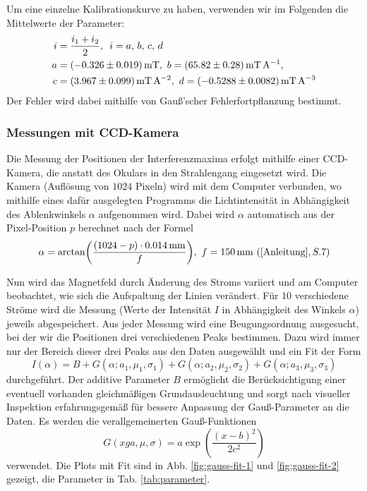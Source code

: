 \documentclass{article}
\begin{document}
\begin{multicols}{2}
Um eine einzelne Kalibrationskurve zu haben, verwenden wir im Folgenden die Mittelwerte der Parameter:
\begin{align*}
  i &= \frac{i_1+i_2}{2},\enspace i=a,\,b,\,c,\,d \\
  a&=\SI{-0.326 \pm 0.019}{\mT},\ b=\SI{65.82 \pm 0.28}{\mT\per\A}, \\
  c&=\SI{3.967 \pm 0.099}{\mT\per\A\squared},\ d=\SI{-0.5288 \pm 0.0082}{\mT\per\A\cubed}
\end{align*}
Der Fehler wird dabei mithilfe von Gauß'scher Fehlerfortpflanzung bestimmt.


\subsubsection{Messungen mit CCD-Kamera} \label{messungmessung}
Die Messung der Positionen der Interferenzmaxima erfolgt mithilfe einer CCD-Kamera, die anstatt des Okulars
in den Strahlengang eingesetzt wird. Die Kamera (Auflösung von $1024$ Pixeln) wird mit dem Computer verbunden, wo mithilfe eines dafür ausgelegten
Programms die Lichtintensität in Abhängigkeit des Ablenkwinkels $\alpha$ aufgenommen wird.
Dabei wird $\alpha$ automatisch aus der Pixel-Position $p$ berechnet nach der Formel
\[
  \alpha = \arctan(\frac{(1024-p) \cdot \SI{0.014}{\mm}}{f}),\ f=\SI{150}{\mm}\ (\cite{Anleitung}, S.7)
\]

Nun wird das Magnetfeld durch Änderung des Stroms variiert und am Computer beobachtet,
wie sich die Aufspaltung der Linien verändert.
Für $10$ verschiedene Ströme wird die Messung (Werte der Intensität $I$ in Abhängigkeit des Winkels $\alpha$) jeweils abgespeichert.
Aus jeder Messung wird eine Beugungsordnung ausgesucht, bei der wir die Positionen drei verschiedenen Peaks bestimmen.
Dazu wird immer nur der Bereich dieser drei Peaks aus den Daten ausgewählt und ein Fit der Form
\[
  I(\alpha) = B + G(\alpha; a_1, \mu_1, \sigma_1) + G(\alpha; a_2, \mu_2, \sigma_2) + G(\alpha; a_3, \mu_3, \sigma_3)
\]
durchgeführt.
Der additive Parameter $B$ ermöglicht die Berücksichtigung einer eventuell vorhanden gleichmäßigen Grundausleuchtung
und sorgt nach visueller Inspektion erfahrungsgemäß für bessere Anpassung der Gauß-Parameter an die Daten.
Es werden die verallgemeinerten Gauß-Funktionen
\[
  G(xg a, \mu, \sigma) = a \exp(\frac{(x-b)^2}{2c^2})
\]
verwendet. 
Die Plots mit Fit sind in Abb. \ref{fig:gauss-fit-1} und \ref{fig:gauss-fit-2} gezeigt, die Parameter in Tab. \ref{tab:parameter}.


\end{multicols}
\end{document}
